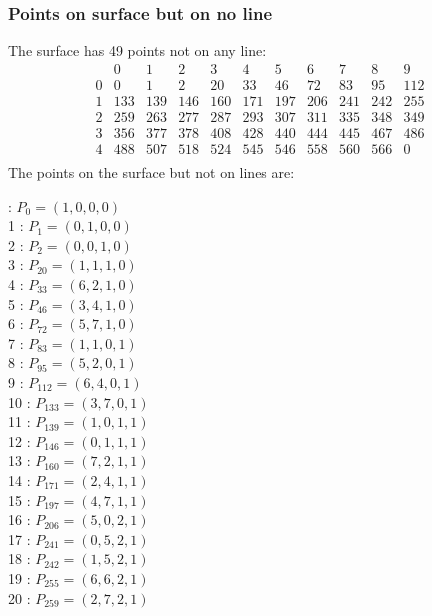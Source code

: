 \documentclass{article}
\begin{document}
{\subsubsection*{Points on surface but on no line}
The surface has 49 points not on any line:\\
$$
\begin{array}{r|*{10}{r}}
 & 0 & 1 & 2 & 3 & 4 & 5 & 6 & 7 & 8 & 9\\
\hline
0 & 0 & 1 & 2 & 20 & 33 & 46 & 72 & 83 & 95 & 112\\
1 & 133 & 139 & 146 & 160 & 171 & 197 & 206 & 241 & 242 & 255\\
2 & 259 & 263 & 277 & 287 & 293 & 307 & 311 & 335 & 348 & 349\\
3 & 356 & 377 & 378 & 408 & 428 & 440 & 444 & 445 & 467 & 486\\
4 & 488 & 507 & 518 & 524 & 545 & 546 & 558 & 560 & 566 & 0\\
\end{array}
$$
The points on the surface but not on lines are:\\
\begin{multicols}{2}
 : $P_{0}=( 1, 0, 0, 0 )$\\
1 : $P_{1}=( 0, 1, 0, 0 )$\\
2 : $P_{2}=( 0, 0, 1, 0 )$\\
3 : $P_{20}=( 1, 1, 1, 0 )$\\
4 : $P_{33}=( 6, 2, 1, 0 )$\\
5 : $P_{46}=( 3, 4, 1, 0 )$\\
6 : $P_{72}=( 5, 7, 1, 0 )$\\
7 : $P_{83}=( 1, 1, 0, 1 )$\\
8 : $P_{95}=( 5, 2, 0, 1 )$\\
9 : $P_{112}=( 6, 4, 0, 1 )$\\
10 : $P_{133}=( 3, 7, 0, 1 )$\\
11 : $P_{139}=( 1, 0, 1, 1 )$\\
12 : $P_{146}=( 0, 1, 1, 1 )$\\
13 : $P_{160}=( 7, 2, 1, 1 )$\\
14 : $P_{171}=( 2, 4, 1, 1 )$\\
15 : $P_{197}=( 4, 7, 1, 1 )$\\
16 : $P_{206}=( 5, 0, 2, 1 )$\\
17 : $P_{241}=( 0, 5, 2, 1 )$\\
18 : $P_{242}=( 1, 5, 2, 1 )$\\
19 : $P_{255}=( 6, 6, 2, 1 )$\\
20 : $P_{259}=( 2, 7, 2, 1 )$\\

\end{multicols}}
\end{document}
